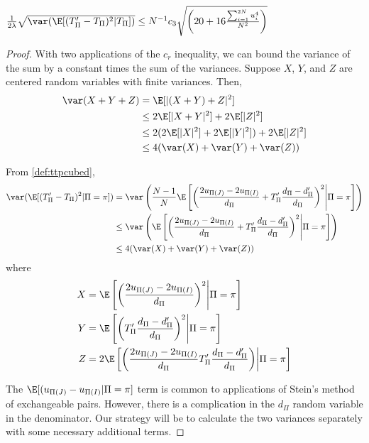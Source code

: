 \begin{proposition}
$\frac{1}{2\lambda} \sqrt{\var (\E [(T_{\Pi}'-T_{\Pi})^2|T_{\Pi}])} \leq N^{-1} c_3\sqrt{\left (20 +
    16\frac{\sum_{i=1}^{2N} u_{i}^4}{N^2} \right )}$
\end{proposition}
\begin{proof}
  With two applications of the $c_r$ inequality, we can bound the
  variance of the sum by a constant times the sum of the variances.  
  Suppose $X$, $Y$, and $Z$ are centered random variables with finite
  variances.  Then, 
  \begin{align*}
    \var(X+Y+Z) &= \E[|(X+Y)+Z|^2] \\
    &\leq 2 \E[|X+Y|^2] + 2\E[|Z|^2] \\
    &\leq 2(2\E[|X|^2] + 2\E[|Y|^2]) + 2\E[|Z|^2] \\
    &\leq 4(\var(X) + \var(Y) + \var(Z))
  \end{align*}

  From \eqref{def:ttpcubed},
  \begin{align*}
    \var (\E[(T_{\Pi}'-T_{\Pi})^2 | \Pi = \pi]) &= \var \left ( \frac{N-1}{N}\E \left [
      \left ( \frac{2u_{\Pi(J)}-2u_{\Pi(I)}}{d_{\Pi}}+T_{\Pi}'\frac{d_{\Pi}-d_{\Pi}'}{d_{\Pi}} \right )^2
        \middle | \Pi = \pi \right ] \right ) \\
    &\leq \var \left ( \E \left [
      \left ( \frac{2u_{\Pi(J)}-2u_{\Pi(I)}}{d_{\Pi}}+T_{\Pi}'\frac{d_{\Pi}-d_{\Pi}'}{d_{\Pi}} \right )^2
        \middle | \Pi = \pi \right ] \right ) \\
    &\leq 4(\var(X) + \var(Y) + \var(Z))
  \end{align*}
  where
  \begin{align*}
    X &= \E \left [ \left ( \frac{2u_{\Pi(J)}-2u_{\Pi(I)}}{d_{\Pi}} \right )^2
        \middle | \Pi = \pi \right ] \\
    Y &= \E \left [ \left
          ( T_{\Pi}'\frac{d_{\Pi}-d_{\Pi}'}{d_{\Pi}} \right )^2 \middle | \Pi = \pi \right ] \\
    Z &= 2 \E \left [ \left ( \frac{2u_{\Pi(J)}-2u_{\Pi(I)}}{d_{\Pi}}
         T_{\Pi}'\frac{d_{\Pi}-d_{\Pi}'}{d_{\Pi}} \right ) \middle | \Pi = \pi \right ]
  \end{align*}

  The $\E[(u_{\Pi(J)}-u_{\Pi(I)} | \Pi = \pi]$ term is common to applications of Stein's method of
  exchangeable pairs.  However, there is a complication in the $d_{\Pi}$ random variable in the
  denominator.  Our strategy will be to calculate the two variances separately with some necessary
  additional terms.


\end{proof}
